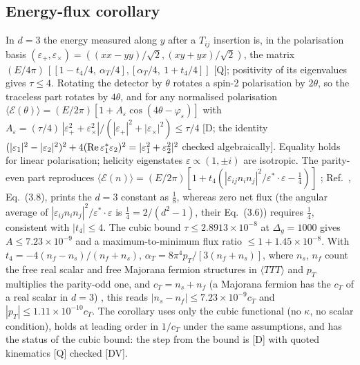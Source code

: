 \documentclass[aps,prl,onecolumn,superscriptaddress,nofootinbib]{revtex4-2}
\begin{document}
\subsection{Energy-flux corollary}
\label{sec:flux}
In $d=3$ the energy measured along $y$ after a $T_{ij}$ insertion is, in the polarisation basis
$(\varepsilon_+,\varepsilon_\times)=((xx-yy)/\sqrt2,(xy+yx)/\sqrt2)$, the matrix
$(E/4\pi)\,[[1-t_4/4,\ \alpha_T/4],[\alpha_T/4,\ 1+t_4/4]]$ \cite[Eq.~(4.39)]{CDPrakash} [Q]; positivity of its eigenvalues gives
$\tau\le4$. Rotating the detector by $\theta$ rotates a spin-2 polarisation by $2\theta$, so the traceless part rotates by $4\theta$,
and for any normalised polarisation
$\langle\mathcal E(\theta)\rangle=(E/2\pi)[1+A_\varepsilon\cos(4\theta-\varphi_\varepsilon)]$ with
$A_\varepsilon=(\tau/4)\,|\varepsilon_+^2+\varepsilon_\times^2|/(|\varepsilon_+|^2+|\varepsilon_\times|^2)\le\tau/4$ [D; the identity
$(|\varepsilon_1|^2-|\varepsilon_2|^2)^2+4({\rm Re}\,\varepsilon_1^*\varepsilon_2)^2=|\varepsilon_1^2+\varepsilon_2^2|^2$ checked
algebraically]. Equality holds for linear polarisation; helicity eigenstates $\varepsilon\propto(1,\pm i)$ are isotropic. The
parity-even part reproduces $\langle\mathcal E(n)\rangle=(E/2\pi)[1+t_4(|\varepsilon_{ij}n_in_j|^2/\varepsilon^*\!\cdot\varepsilon-\tfrac14)]$
\cite{HofmanMaldacena,Buchel}; Ref.~\cite{Buchel}, Eq.~(3.8), prints the $d=3$ constant as $\tfrac18$, whereas zero net flux (the angular
average of $|\varepsilon_{ij}n_in_j|^2/\varepsilon^*\!\cdot\varepsilon$ is $\tfrac14=2/(d^2-1)$, their Eq.~(3.6)) requires $\tfrac14$,
consistent with $|t_4|\le4$. The cubic bound $\tau\le2.8913\times10^{-8}$ at $\Delta_g=1000$ gives $A\le7.23\times10^{-9}$ and a
maximum-to-minimum flux ratio $\le1+1.45\times10^{-8}$. With $t_4=-4(n_f-n_s)/(n_f+n_s)$, $\alpha_T=8\pi^4p_T/[3(n_f+n_s)]$, where
$n_s$, $n_f$ count the free real scalar and free Majorana fermion structures in $\langle TTT\rangle$ and $p_T$ multiplies the
parity-odd one, and $c_T=n_s+n_f$ (a Majorana fermion has the $c_T$ of a real scalar in $d=3$) \cite{CDPrakash}, this reads
$|n_s-n_f|\le7.23\times10^{-9}c_T$ and $|p_T|\le1.11\times10^{-10}c_T$. The corollary uses only the cubic functional (no $\kappa$, no
scalar condition), holds at leading order in $1/c_T$ under the same assumptions, and has the status of the cubic bound: the step
from the bound is [D] with quoted kinematics [Q] checked [DV].
\end{document}
